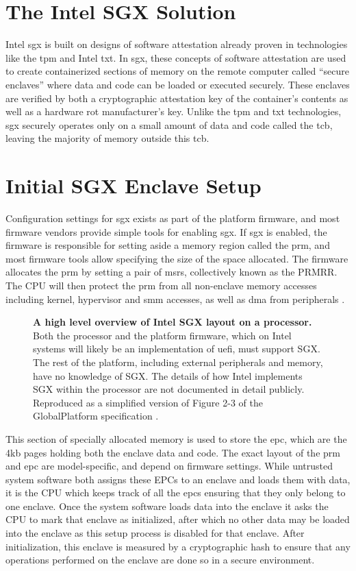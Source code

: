 \section{The Intel SGX Solution}
Intel \gls{sgx} is built on designs of software attestation already proven in technologies like the \gls{tpm} and Intel \gls{txt}. In \gls{sgx}, these concepts of software attestation are used to create containerized sections of memory on the remote computer called ``secure enclaves'' where data and code can be loaded or executed securely. These enclaves are verified by both a cryptographic attestation key of the container’s contents as well as a hardware \gls{rot} manufacturer’s key. Unlike the \gls{tpm} and \gls{txt} technologies, \gls{sgx} securely operates only on a small amount of data and code called the \gls{tcb}, leaving the majority of memory outside this \gls{tcb}.
\section{Initial SGX Enclave Setup}
Configuration settings for \gls{sgx} exists as part of the platform firmware, and most firmware vendors provide simple tools for enabling \gls{sgx}. If \gls{sgx} is enabled, the firmware is responsible for setting aside a memory region called the \gls{prm}, and most firmware tools allow specifying the size of the space allocated. The firmware allocates the \gls{prm} by setting a pair of \glspl{msr}, collectively known as the PRMRR. The CPU will then protect the \gls{prm} from all non-enclave memory accesses including kernel, hypervisor and \gls{smm} accesses, as well as \gls{dma} from peripherals \cite{Costan2016}.

\begin{figure}[hb]
\centering

\caption[High Level SGX Overview]{\textbf{A high level overview of Intel SGX layout on a processor.} Both the processor and the platform firmware, which on Intel systems will likely be an implementation of \gls{uefi}, must support SGX. The rest of the platform, including external peripherals and memory, have no knowledge of SGX. The details of how Intel implements SGX within the processor are not documented in detail publicly. Reproduced as a simplified version of Figure 2-3 of the GlobalPlatform specification \cite{GlobalPlatform2018}.}
\label{fig:sgx-hl}
\end{figure}

This section of specially allocated memory is used to store the \gls{epc}, which are the 4kb pages holding both the enclave data and code. The exact layout of the \gls{prm} and \gls{epc} are model-specific, and depend on firmware settings. While untrusted system software both assigns these EPCs to an enclave and loads them with data, it is the CPU which keeps track of all the \gls{epc}s ensuring that they only belong to one enclave. Once the system software loads data into the enclave it asks the CPU to mark that enclave as initialized, after which no other data may be loaded into the enclave as this setup process is disabled for that enclave. After initialization, this enclave is measured by a cryptographic hash to ensure that any operations performed on the enclave are done so in a secure environment.

